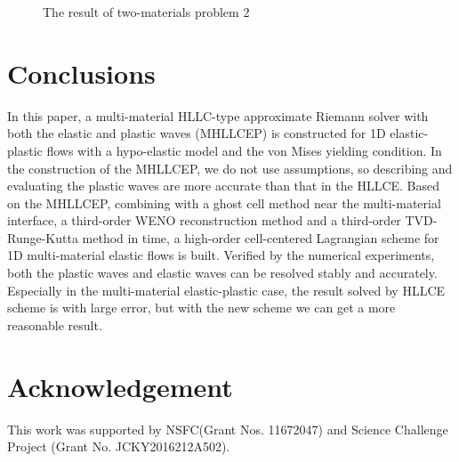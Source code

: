 \documentclass{article}
\numberwithin{equation}{section}
\numberwithin{table}{section}
\begin{document}
\begin{figure}
	  \caption{ The result of two-materials  problem 2}
	  \label{fig:multi2}
	\end{figure}

\section*{Conclusions}
In this paper,  a multi-material HLLC-type  approximate Riemann solver with both the elastic and plastic waves (MHLLCEP) is constructed for 1D elastic-plastic flows with a hypo-elastic model and the von Mises yielding condition. In the  construction of  the  MHLLCEP, we do not use assumptions, so describing  and evaluating the plastic waves are  more accurate than that in the  HLLCE.  Based on the MHLLCEP, combining with a  ghost cell method near the multi-material interface,   a  third-order WENO reconstruction method and a third-order TVD-Runge-Kutta method in time, a high-order cell-centered Lagrangian scheme for 1D multi-material elastic flows is built. Verified by the numerical experiments, both the plastic waves and elastic waves can be resolved stably and accurately. Especially in the multi-material elastic-plastic case,  the result solved by HLLCE scheme is with large error, but with the  new scheme  we  can get a more reasonable result. 












%
\section*{Acknowledgement}
This work was supported by NSFC(Grant Nos. 11672047) and Science Challenge Project (Grant No. JCKY2016212A502).






\newpage
  \appendix
  \renewcommand{\appendixname}{Appendix~}
\end{document}
